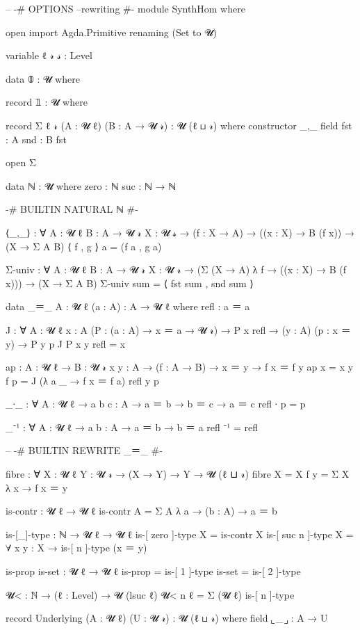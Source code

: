 

\begin{code}
-- {-# OPTIONS --rewriting #-}
module SynthHom where

open import Agda.Primitive renaming (Set to 𝓤)

variable
    ℓ 𝓇 𝓈 : Level

data 𝟘 : 𝓤 where

record 𝟙 : 𝓤 where

record Σ {ℓ 𝓇} (A : 𝓤 ℓ) (B : A → 𝓤 𝓇) : 𝓤 (ℓ ⊔ 𝓇) where
    constructor _,_
    field
        fst : A
        snd : B fst

open Σ

data ℕ : 𝓤 where
    zero : ℕ
    suc : ℕ → ℕ

{-# BUILTIN NATURAL ℕ #-}

⟨_,_⟩ : ∀ {A : 𝓤 ℓ} {B : A → 𝓤 𝓇} {X : 𝓤 𝓈} → (f : X → A) → ((x : X) → B (f x)) → (X → Σ A B)   
⟨ f , g ⟩ a = (f a , g a)
    
Σ-univ : ∀ {A : 𝓤 ℓ} {B : A → 𝓤 𝓇} {X : 𝓤 𝓇} → (Σ (X → A) λ f → ((x : X) → B (f x))) → (X → Σ A B)
Σ-univ sum = ⟨ fst sum , snd sum ⟩

data  _＝_ {A : 𝓤 ℓ} (a : A) : A → 𝓤 ℓ where
    refl : a ＝ a

J : ∀ {A : 𝓤 ℓ} {x : A} (P : (a : A) → x ＝ a → 𝓤 𝓇) → P x refl → (y : A) (p : x ＝ y) → P y p
J P x y refl = x

ap : {A : 𝓤 ℓ} → {B : 𝓤 𝓇} {x y : A} → (f : A → B) → x ＝ y → f x ＝ f y
ap {x = x} {y} f p = J (λ a _ → f x ＝ f a) refl y p

_∙_ : ∀ {A : 𝓤 ℓ} → {a b c : A} → a ＝ b → b ＝ c → a ＝ c
refl ∙ p = p

_⁻¹ : ∀ {A : 𝓤 ℓ} → {a b : A} → a ＝ b → b ＝ a
refl ⁻¹ = refl

-- {-# BUILTIN REWRITE _＝_ #-}

fibre : ∀ {X : 𝓤 ℓ} {Y : 𝓤 𝓇} → (X → Y) → Y → 𝓤 (ℓ ⊔ 𝓇)
fibre {X = X} f y = Σ X λ x → f x ＝ y   

is-contr : 𝓤 ℓ → 𝓤 ℓ
is-contr A = Σ A λ a → (b : A) → a ＝ b  

is-[_]-type : ℕ → 𝓤 ℓ → 𝓤 ℓ
is-[ zero ]-type X = is-contr X
is-[ suc n ]-type X = ∀ {x y : X} → is-[ n ]-type (x ＝ y)

is-prop is-set : 𝓤 ℓ → 𝓤 ℓ
is-prop = is-[ 1 ]-type
is-set = is-[ 2 ]-type

𝓤< : ℕ → (ℓ : Level) → 𝓤 (lsuc ℓ)
𝓤< n ℓ = Σ (𝓤 ℓ) is-[ n ]-type

record Underlying (A : 𝓤 ℓ) (U : 𝓤 𝓇) : 𝓤 (ℓ ⊔ 𝓇) where
    field ⌞_⌟ : A → U


\end{code}

